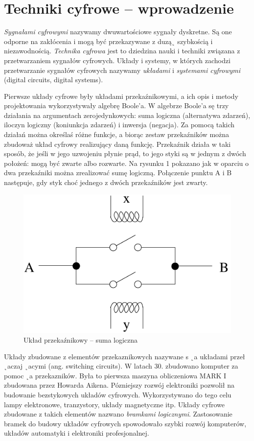 \documentclass[a4paper,11pt]{article}
\begin{document}
 
\section*{Techniki cyfrowe -- wprowadzenie}
 \textsl{Sygnałami cyfrowymi} nazywamy dwuwartościowe sygnały dyskretne. Są one odporne na zakłócenia i mogą być przekazywane z duzą˛ szybkością i niezawodnością. \textsl{Technika cyfrowa} jest to dziedzina nauki i techniki związana z przetwarzaniem sygnałów cyfrowych. Układy i systemy, w których zachodzi przetwarzanie sygnałów cyfrowych nazywamy \textsl{układami} i \textsl{systemami cyfrowymi} (digital circuits, digital systems).
 
  Pierwsze układy cyfrowe były układami przekaźnikowymi, a ich opis i metody projektowania wykorzystywały algebrę Boole’a. W algebrze Boole’a sę trzy działania na argumentach zerojedynkowych: suma logiczna (alternatywa zdarzeń), iloczyn logiczny (koniunkcja zdarzeń) i inwersja (negacja). Za pomocą takich działań można określaś różne funkcje, a biorąc zestaw przekaźników można zbudoważ układ cyfrowy realizujący daną funkcję. Przekaźnik działa w taki sposób, że jeśli w jego uzwojeniu płynie prąd, to jego styki są w jednym z dwóch położeń: mogą być zwarte albo rozwarte. Na rysunku 1 pokazano jak w oparciu o dwa przekaźniki można zrealizować sumę logiczną. Połączenie punktu A i B następuje, gdy styk choć jednego z dwóch przekaźników jest zwarty.
\begin{figure}[!htb]
\centerline{\includegraphics[scale=0.6]{uklad-przekaznikowy.pdf}}
\caption{Układ przekaźnikowy -- suma logiczna}
\label{fig:ukladPrzekaznikowy}
\end{figure}

Układy zbudowane z elementów przekaznikowych nazywane s ˛a układami przeł ˛aczaj ˛acymi
(ang. switching circuits). W latach 30. zbudowano komputer za pomoc ˛a przekazników. Była
to pierwsza maszyna obliczeniowa MARK I zbudowana przez Howarda Aikena. Pózniejszy rozwój elektroniki pozwolił na budowanie bezstykowych układów cyfrowych. Wykorzystywano do
tego celu lampy elektronowe, tranzystory, układy magnetyczne itp. Układy cyfrowe zbudowane
z takich elementów nazwano \textsl{bramkami logicznymi}. Zastosowanie bramek do budowy układów
cyfrowych spowodowało szybki rozwój komputerów, układów automatyki i elektroniki profesjonalnej.
\end{document}
